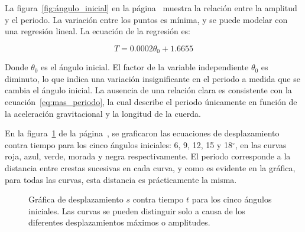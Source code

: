 \documentclass[letterpaper]{report}
\numberwithin{table}{section}
\begin{document}
La figura~\ref{fig:ángulo_inicial} en la
página~\pageref{fig:ángulo_inicial} muestra la relación entre la
amplitud y el periodo. La variación entre los puntos es mínima, y se puede
modelar con una regresión lineal. La ecuación de la regresión es:

\begin{equation}
  T = 0.0002\theta_{0} + 1.6655
\end{equation}

Donde $\theta_{0}$ es el ángulo inicial. El factor de la variable
independiente $\theta_{0}$ es diminuto, lo que indica una variación
insignificante en el periodo a medida que se cambia el ángulo
inicial. La ausencia de una relación clara es consistente con la
ecuación~\ref{eq:mas_periodo}, la cual describe el periodo únicamente
en función de la aceleración gravitacional y la longitud de la cuerda.

En la figura~\ref{fig:comparación_desplazamiento_tiempo} de la
página~\pageref{fig:comparación_desplazamiento_tiempo}, se
graficaron las ecuaciones de desplazamiento contra tiempo para los cinco ángulos
iniciales: 6, 9, 12, 15 y 18$^{\circ}$, en las curvas roja, azul,
verde, morada y negra respectivamente. El periodo corresponde a la
distancia entre crestas sucesivas en cada curva, y como es evidente
en la gráfica, para todas las curvas, esta distancia es prácticamente la misma.

\begin{figure}[H]
  \centering
  \caption{Gráfica de desplazamiento $s$ contra tiempo $t$ para los
    cinco ángulos iniciales. Las curvas se pueden distinguir solo a
    causa de los diferentes desplazamientos máximos o
  amplitudes.}\label{fig:comparación_desplazamiento_tiempo}
\end{figure}
\end{document}

